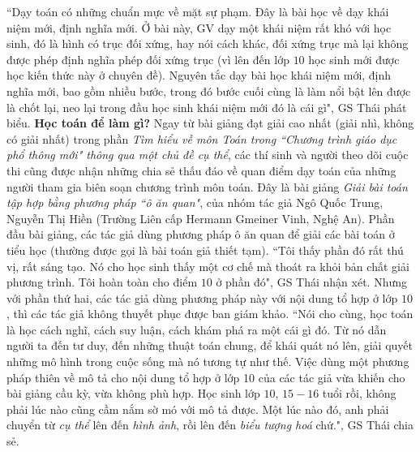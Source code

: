 \begin{multicols}{2}
	\vskip 0.1cm
	``Dạy toán có những chuẩn mực về mặt sự phạm. Đây là bài học về dạy khái niệm mới, định nghĩa mới. Ở bài này, GV dạy một khái niệm rất khó với học sinh, đó là hình có trục đối xứng, hay nói cách khác, đối xứng trục mà lại không được phép định nghĩa phép đối xứng trục (vì lên đến lớp $10$ học sinh mới được học kiến thức này ở chuyên đề). Nguyên tắc dạy bài học khái niệm mới, định nghĩa mới, bao gồm nhiều bước, trong đó bước cuối cùng là làm nổi bật lên được là chốt lại, neo lại trong đầu học sinh khái niệm mới đó là cái gì", GS Thái phát biểu. 
	\vskip 0.1cm
	\textbf{\color{diendantoanhoc}Học toán để làm gì?} 
	\vskip 0.1cm
	Ngay từ bài giảng đạt giải cao nhất (giải nhì, không có giải nhất) trong phần \textit{Tìm hiểu về môn Toán trong ``Chương trình giáo dục phổ thông mới" thông qua một chủ đề cụ thể}, các thí sinh và người theo dõi cuộc thi cũng được nhận những chia sẻ thấu đáo về quan điểm dạy toán của những người tham gia biên soạn chương trình môn toán. Đây là bài giảng \textit{Giải bài toán tập hợp bằng phương pháp ``ô ăn quan"}, của nhóm tác giả Ngô Quốc Trung, Nguyễn Thị Hiền (Trường Liên cấp Hermann Gmeiner Vinh, Nghệ An). Phần đầu bài giảng, các tác giả dùng phương pháp ô ăn quan để giải các bài toán ở tiểu học (thường được gọi là bài toán giả thiết tạm). ``Tôi thấy phần đó rất thú vị, rất sáng tạo. Nó cho học sinh thấy một cơ chế mà thoát ra khỏi bản chất giải phương trình. Tôi hoàn toàn cho điểm $10$ ở phần đó", GS Thái nhận xét.
	\vskip 0.1cm
	Nhưng với phần thứ hai, các tác giả dùng phương pháp này với nội dung tổ hợp ở lớp $10$, thì các tác giả không thuyết phục được ban giám khảo. ``Nói cho cùng, học toán là học cách nghĩ, cách suy luận, cách khám phá ra một cái gì đó. Từ nó dẫn người ta đến tư duy, đến những thuật toán chung, để khái quát nó lên, giải quyết những mô hình trong cuộc sống mà nó tương tự như thế. Việc dùng một phương pháp thiên về mô tả cho nội dung tổ hợp ở lớp 10 của các tác giả vừa khiến cho bài giảng cầu kỳ, vừa không phù hợp.  Học sinh lớp $10$, $15-16$ tuổi rồi, không phải lúc nào cũng cầm nắm sờ mó với mô tả được. Một lúc nào đó, anh phải chuyển từ \textit{cụ thể} lên đến \textit{hình ảnh}, rồi lên đến \textit{biểu tượng hoá} chứ.",  GS Thái chia sẻ.
	\vskip 0.1cm
	

\end{multicols}
